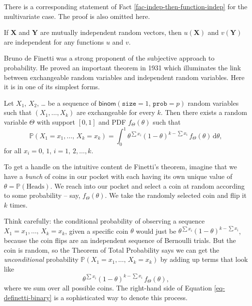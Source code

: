 There is a corresponding statement of Fact
\ref{fac-indep-then-function-indep} for the multivariate case. The proof is
also omitted here.

\begin{fact}
If \(\mathbf{X}\) and \(\mathbf{Y}\) are mutually independent random
vectors, then \(u(\mathbf{X})\) and \(v(\mathbf{Y})\) are independent
for any functions \(u\) and \(v\).
\end{fact}

Bruno de Finetti was a strong proponent of the subjective approach to
probability. He proved an important theorem in 1931 which illuminates
the link between exchangeable random variables and independent random
variables. Here it is in one of its simplest forms.

\begin{thm}
Let \(X_{1}\), \(X_{2}\), \ldots{} be a sequence of
\(\mathsf{binom}(\mathtt{size}=1,\,\mathtt{prob}=p)\) random variables
such that \((X_{1},\ldots,X_{k})\) are exchangeable for every
\(k\). Then there exists a random variable \(\Theta\) with support
\([0,1]\) and PDF \(f_{\Theta}(\theta)\) such that
\begin{equation}
\label{eq-definetti-binary}
\mathbb{P}(X_{1}=x_{1},\ldots,\, X_{k}=x_{k})=\int_{0}^{1}\theta^{\sum x_{i}}(1-\theta)^{k-\sum x_{i}}\, f_{\Theta}(\theta)\,\mathrm{d}\theta,
\end{equation}
for all \(x_{i}=0,\,1\), \(i=1,\,2,\ldots,k\).
\end{thm}

To get a handle on the intuitive content de Finetti's theorem, imagine
that we have a \emph{bunch} of coins in our pocket with each having its own
unique value of \(\theta=\mathbb{P}(\mbox{Heads})\). We reach into our
pocket and select a coin at random according to some probability --
say, \(f_{\Theta}(\theta)\). We take the randomly selected coin and
flip it \(k\) times.

Think carefully: the conditional probability of observing a sequence
\(X_{1}=x_{1},\ldots,\, X_{k}=x_{k}\), given a specific coin
\(\theta\) would just be \(\theta^{\sum x_{i}}(1-\theta)^{k-\sum
x_{i}}\), because the coin flips are an independent sequence of
Bernoulli trials. But the coin is random, so the Theorem of Total
Probability says we can get the \emph{unconditional} probability
\(\mathbb{P}(X_{1}=x_{1},\ldots,\, X_{k}=x_{k})\) by adding up terms
that look like
\begin{equation}
\theta^{\sum x_{i}}(1-\theta)^{k-\sum x_{i}}\, f_{\Theta}(\theta),
\end{equation}
where we sum over all possible coins. The right-hand side of Equation
\eqref{eq-definetti-binary} is a sophisticated way to denote this process.

